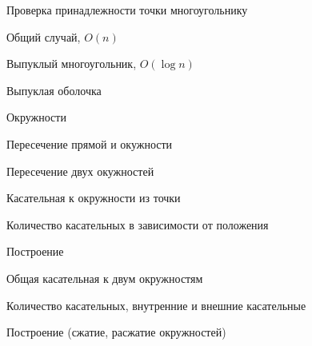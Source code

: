 \documentclass[a4paper,12pt]{article}
\begin{document}
\begin{multicols}{2}
\begin{compactenum}
\begin{compactenum}
      \item{Проверка принадлежности точки многоугольнику}
      \begin{compactenum}
        \item{Общий случай, $O(n)$}
        \item{Выпуклый многоугольник, $O(\log n)$}
      \end{compactenum}

      \item{Выпуклая оболочка}
    \end{compactenum}

    \item{Окружности}
      \begin{compactenum}
        \item{Пересечение прямой и окужности}
        \item{Пересечение двух окужностей}
        \item{Касательная к окружности из точки}
        \begin{compactenum}
          \item{Количество касательных в зависимости от положения}
          \item{Построение}
        \end{compactenum}

      \item{Общая касательная к двум окружностям}
        \begin{compactenum}
          \item{Количество касательных, внутренние и внешние касательные}
          \item{Построение (сжатие, расжатие окружностей)}
        \end{compactenum}
      \end{compactenum}
    \end{compactenum}


\end{multicols}
\end{document}
